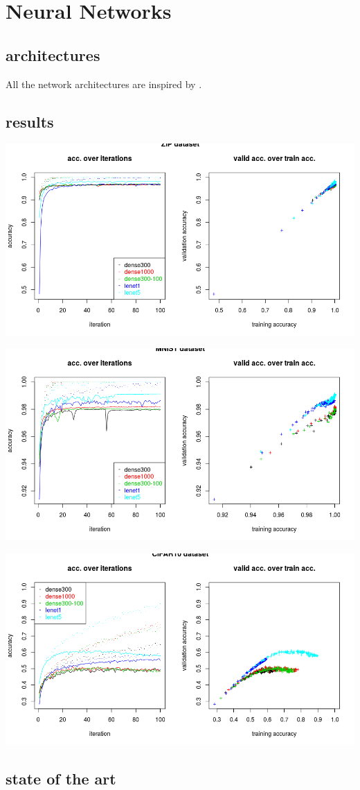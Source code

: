 
\section{Neural Networks}

\subsection{architectures}

All the network architectures are inspired by \cite{lecun98}.

\subsection{results}

\includegraphics[width=\textwidth]{../plots/nn_zip}

\includegraphics[width=\textwidth]{../plots/nn_mnist}

\includegraphics[width=\textwidth]{../plots/nn_cifar10}

\subsection{state of the art}